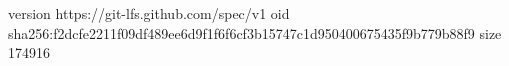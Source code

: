 version https://git-lfs.github.com/spec/v1
oid sha256:f2dcfe2211f09df489ee6d9f1f6f6cf3b15747c1d950400675435f9b779b88f9
size 174916

